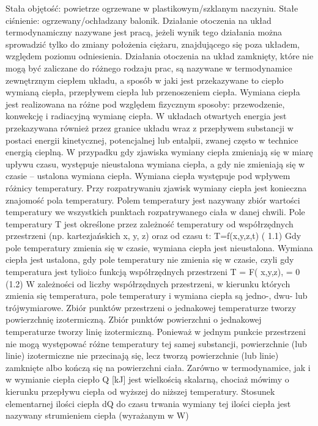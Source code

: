 \documentclass[]{article}
\begin{document}
Stała objętość: powietrze ogrzewane w plastikowym/szklanym naczyniu.
Stałe ciśnienie: ogrzewany/ochładzany balonik. Działanie otoczenia na
układ termodynamiczny nazywane jest pracą, jeżeli wynik tego działania
można sprowadzić tylko do zmiany położenia ciężaru, znajdującego się
poza układem, względem poziomu odniesienia. Działania otoczenia na układ
zamknięty, które nie mogą być zaliczane do różnego rodzaju prac, są
nazywane w termodynamice zewnętrznym ciepłem układu, a sposób w jaki
jest przekazywane to ciepło wymianą ciepła, przepływem ciepła lub
przenoszeniem ciepła. Wymiana ciepła jest realizowana na różne pod
względem fizycznym sposoby: przewodzenie, konwekcję i radiacyjną wymianę
ciepła. W układach otwartych energia jest przekazywana również przez
granice układu wraz z przepływem substancji w postaci energii
kinetycznej, potencjalnej lub entalpii, zwanej często w technice energią
cieplną. W przypadku gdy zjawiska wymiany ciepła zmieniają się w miarę
upływu czasu, występuje nieustalona wymiana ciepła, a gdy nie zmieniają
się w czasie -- ustalona wymiana ciepła. Wymiana ciepła występuje pod
wpływem różnicy temperatury. Przy rozpatrywaniu zjawisk wymiany ciepła
jest konieczna znajomość pola temperatury. Polem temperatury jest
nazywany zbiór wartości temperatury we wszystkich punktach
rozpatrywanego ciała w danej chwili. Pole temperatury T jest określone
przez zależność temperatury od współrzędnych przestrzeni (np.
kartezjańskich x, y, z) oraz od czasu t: T=f(x,y,z,t) ( 1.1) Gdy pole
temperatury zmienia się w czasie, wymiana ciepła jest nieustalona.
Wymiana ciepła jest ustalona, gdy pole temperatury nie zmienia się w
czasie, czyli gdy temperatura jest tylioi:o funkcją współrzędnych
przestrzeni T = F( x,y,z), = 0 (1.2) W zależności od liczby
współrzędnych przestrzeni, w kierunku których zmienia się temperatura,
pole temperatury i wymiana ciepła są jedno-, dwu- lub trójwymiarowe.
Zbiór punktów przestrzeni o jednakowej temperaturze tworzy powierzchnię
izotermiczną. Zbiór punktów powierzchni o jednakowej temperaturze tworzy
linię izotermiczną. Ponieważ w jednym punkcie przestrzeni nie mogą
występować różne temperatury tej samej substancji, powierzchnie (lub
linie) izotermiczne nie przecinają się, lecz tworzą powierzchnie (lub
linie) zamknięte albo kończą się na powierzchni ciała. Zarówno w
termodynamice, jak i w wymianie ciepła ciepło Q {[}kJ{]} jest wielkością
skalarną, chociaż mówimy o kierunku przepływu ciepła od wyższej do
niższej temperatury. Stosunek elementarnej ilości ciepła dQ do czasu
trwania wymiany tej ilości ciepła jest nazywany strumieniem ciepła
(wyrażanym w W)
\end{document}
